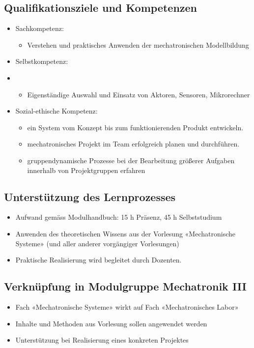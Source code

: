 \subsection*{Qualifikationsziele und Kompetenzen}
\begin{itemize}
    \item Sachkompetenz:
    \begin{itemize}
        \item Verstehen und praktisches Anwenden der mechatronischen Modellbildung
    \end{itemize}
    \item Selbstkompetenz:
    \item \begin{itemize}
        \item Eigenständige Auswahl und Einsatz von Aktoren, Sensoren, Mikrorechner
    \end{itemize}
    \item Sozial-ethische Kompetenz:
    \begin{itemize}
        \item ein System vom Konzept bis zum funktionierenden Produkt entwickeln.
        \item mechatronisches Projekt im Team erfolgreich planen und durchführen.
        \item gruppendynamische Prozesse bei der Bearbeitung größerer Aufgaben innerhalb von Projektgruppen erfahren
    \end{itemize}
\end{itemize}

\subsection*{Unterstützung des Lernprozesses}
\begin{itemize}
    \item Aufwand gemäss Modulhandbuch: 15 h Präsenz, 45 h Selbststudium
    \item Anwenden des theoretischen Wissens aus der Vorlesung «Mechatronische Systeme» (und aller anderer vorgängiger Vorlesungen)
    \item Praktische Realisierung wird begleitet durch Dozenten.    
\end{itemize}

\subsection*{Verknüpfung in Modulgruppe Mechatronik III}
\begin{itemize}
    \item Fach «Mechatronische Systeme» wirkt auf Fach «Mechatronisches Labor»
    \item Inhalte und Methoden aus Vorlesung sollen angewendet werden
    \item Unterstützung bei Realisierung eines konkreten Projektes
\end{itemize}

